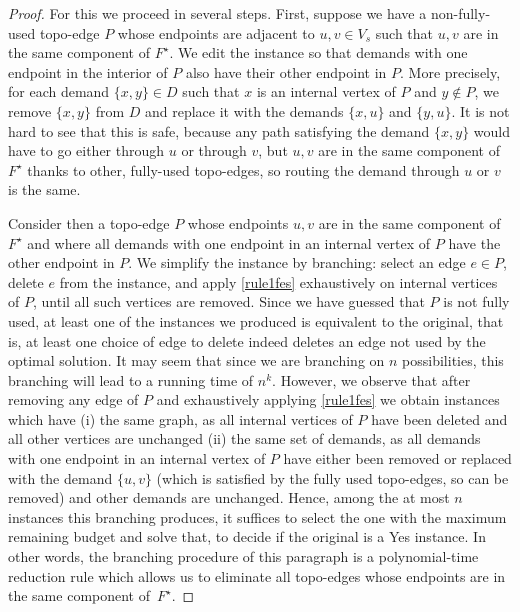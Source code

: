 \begin{proof}
For this we proceed in several steps.  First, suppose we have a non-fully-used
topo-edge $P$ whose endpoints are adjacent to $u,v\in V_s$ such that $u,v$ are
in the same component of $F^\star$. We edit the instance so that demands with one
endpoint in the interior of $P$ also have their other endpoint in $P$. More
precisely, for each demand $\{x,y\}\in D$ such that $x$ is an internal vertex
of $P$ and $y\not\in P$, we remove $\{x,y\}$ from $D$ and replace it with the
demands $\{x,u\}$ and $\{y,u\}$. It is not hard to see that this is safe,
because any path satisfying the demand $\{x,y\}$ would have to go either
through $u$ or through $v$, but $u,v$ are in the same component of $F^\star$ thanks
to other, fully-used topo-edges, so routing the demand through $u$ or $v$ is
the same.

Consider then a topo-edge $P$ whose endpoints $u,v$ are in the same component
of $F^\star$ and where all demands with one endpoint in an internal vertex of $P$
have the other endpoint in $P$. We simplify the instance by branching: select
an edge $e\in P$, delete $e$ from the instance, and apply \ref{rule1fes} exhaustively
on internal vertices of $P$, until all such vertices are removed.  Since we
have guessed that $P$ is not fully used, at least one of the instances we
produced is equivalent to the original, that is, at least one choice of edge to
delete indeed deletes an edge not used by the optimal solution. It may seem
that since we are branching on $n$ possibilities, this branching will lead to a
running time of $n^k$.  However, we observe that after removing any edge of $P$
and exhaustively applying \ref{rule1fes} we obtain instances which have (i)
the same graph, as all internal vertices of $P$ have been deleted and all other
vertices are unchanged (ii) the same set of demands, as all demands with one
endpoint in an internal vertex of $P$ have either been removed or replaced with
the demand $\{u,v\}$ (which is satisfied by the fully used topo-edges, so can
be removed) and other demands are unchanged.  Hence, among the at most $n$
instances this branching produces, it suffices to select the one with the
maximum remaining budget and solve that, to decide if the original is a Yes
instance. In other words, the branching procedure of this paragraph is a
polynomial-time reduction rule which allows us to eliminate all topo-edges
whose endpoints are in the same component of~$F^\star$.


\end{proof}
